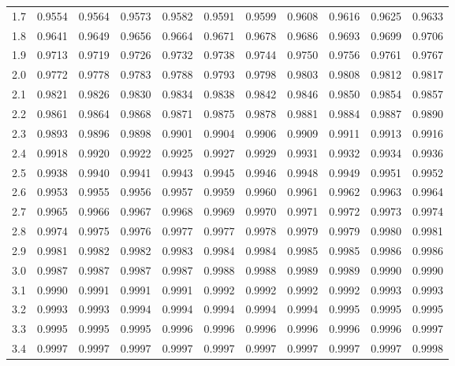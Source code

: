 \documentclass[12pt,a4paper]{article}
\begin{document}
\begin{enumerate}
\begin{center}
\begin{longtable}{ccccccccccc}
1.7 & 0.9554 & 0.9564 & 0.9573 & 0.9582 & 0.9591 & 0.9599 & 0.9608 & 0.9616 & 0.9625 & 0.9633 \\
1.8 & 0.9641 & 0.9649 & 0.9656 & 0.9664 & 0.9671 & 0.9678 & 0.9686 & 0.9693 & 0.9699 & 0.9706 \\
1.9 & 0.9713 & 0.9719 & 0.9726 & 0.9732 & 0.9738 & 0.9744 & 0.9750 & 0.9756 & 0.9761 & 0.9767 \\
2.0 & 0.9772 & 0.9778 & 0.9783 & 0.9788 & 0.9793 & 0.9798 & 0.9803 & 0.9808 & 0.9812 & 0.9817 \\
2.1 & 0.9821 & 0.9826 & 0.9830 & 0.9834 & 0.9838 & 0.9842 & 0.9846 & 0.9850 & 0.9854 & 0.9857 \\
2.2 & 0.9861 & 0.9864 & 0.9868 & 0.9871 & 0.9875 & 0.9878 & 0.9881 & 0.9884 & 0.9887 & 0.9890 \\
2.3 & 0.9893 & 0.9896 & 0.9898 & 0.9901 & 0.9904 & 0.9906 & 0.9909 & 0.9911 & 0.9913 & 0.9916 \\
2.4 & 0.9918 & 0.9920 & 0.9922 & 0.9925 & 0.9927 & 0.9929 & 0.9931 & 0.9932 & 0.9934 & 0.9936 \\
2.5 & 0.9938 & 0.9940 & 0.9941 & 0.9943 & 0.9945 & 0.9946 & 0.9948 & 0.9949 & 0.9951 & 0.9952 \\
2.6 & 0.9953 & 0.9955 & 0.9956 & 0.9957 & 0.9959 & 0.9960 & 0.9961 & 0.9962 & 0.9963 & 0.9964 \\
2.7 & 0.9965 & 0.9966 & 0.9967 & 0.9968 & 0.9969 & 0.9970 & 0.9971 & 0.9972 & 0.9973 & 0.9974 \\
2.8 & 0.9974 & 0.9975 & 0.9976 & 0.9977 & 0.9977 & 0.9978 & 0.9979 & 0.9979 & 0.9980 & 0.9981 \\
2.9 & 0.9981 & 0.9982 & 0.9982 & 0.9983 & 0.9984 & 0.9984 & 0.9985 & 0.9985 & 0.9986 & 0.9986 \\
3.0 & 0.9987 & 0.9987 & 0.9987 & 0.9987 & 0.9988 & 0.9988 & 0.9989 & 0.9989 & 0.9990 & 0.9990 \\
3.1 & 0.9990 & 0.9991 & 0.9991 & 0.9991 & 0.9992 & 0.9992 & 0.9992 & 0.9992 & 0.9993 & 0.9993 \\
3.2 & 0.9993 & 0.9993 & 0.9994 & 0.9994 & 0.9994 & 0.9994 & 0.9994 & 0.9995 & 0.9995 & 0.9995 \\
3.3 & 0.9995 & 0.9995 & 0.9995 & 0.9996 & 0.9996 & 0.9996 & 0.9996 & 0.9996 & 0.9996 & 0.9997 \\
3.4 & 0.9997 & 0.9997 & 0.9997 & 0.9997 & 0.9997 & 0.9997 & 0.9997 & 0.9997 & 0.9997 & 0.9998 \\
\end{longtable}
\end{center}


\end{enumerate}
\end{document}

